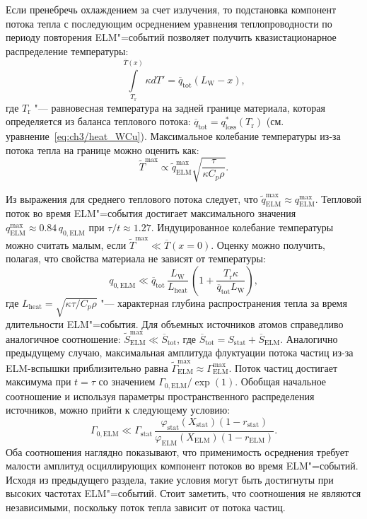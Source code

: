 Если пренебречь охлаждением за счет излучения, то подстановка компонент потока тепла с последующим осреднением уравнения теплопроводности по периоду повторения ELM"=событий позволяет получить квазистационарное распределение температуры:
\begin{equation}
	\label{eq:ch3/temp_av}
	\int \limits_{{T}_\mathrm{r}}^{\overline{T}(x)} \kappa dT' = \overline{q}_{\mathrm{tot}} (L_\mathrm{W}-x),
\end{equation}
где $T_\mathrm{r}$ "--- равновесная температура на задней границе материала, которая определяется из баланса теплового потока: $\overline{q}_{\mathrm{tot}}=q_{\mathrm{loss}}^*(T_\mathrm{r})$ (см. уравнение~\cref{eq:ch3/heat_WCu}). Максимальное колебание температуры из-за потока тепла на границе можно оценить как:
\begin{equation}
	\label{eq:ch3/temp_fluct}
	\widetilde{T}^{\max} \propto \widetilde{q}_{\mathrm{ELM}}^{\max} \sqrt{\frac{\tau}{\kappa C_p \rho}}.
\end{equation}

Из выражения для среднего теплового потока следует, что $\widetilde{q}_{\mathrm{ELM}}^{\max} \approx q_{\mathrm{ELM}}^{\max}$. Тепловой поток во время ELM"=события достигает максимального значения $q_{\mathrm{ELM}}^{\max}\approx 0.84 \, q_{0,\mathrm{ELM}}$ при $\tau/t\approx 1.27$. Индуцированное колебание температуры можно считать малым, если $\widetilde{T}^{\max} \ll \overline{T}(x=0)$. Оценку можно получить, полагая, что свойства материала не зависят от температуры:
\begin{equation}
	\label{eq:heat_condition}
	q_{0,\mathrm{ELM}} \ll \overline{q}_{\mathrm{tot}}\,\frac{ L_\mathrm{W}}{L_{\mathrm{heat}}}\,\left( 1+\frac{T_\mathrm{r}\kappa}{\overline{q}_{\mathrm{tot}}L_\mathrm{W}}\right),
\end{equation}
где $L_{\mathrm{heat}}=\sqrt{\kappa\tau/C_p\rho}$ "--- характерная глубина распространения тепла за время длительности ELM"=события. Для объемных источников атомов справедливо аналогичное соотношение: $\widetilde{S}^{\max}_{\mathrm{ELM}} \ll \overline{S}_{\mathrm{tot}}$, где $\overline{S}_{\mathrm{tot}}=S_{\mathrm{stat}}+\overline{S}_{\mathrm{ELM}}$. Аналогично предыдущему случаю, максимальная амплитуда флуктуации потока частиц из-за ELM-вспышки приблизительно равна $\widetilde{\Gamma}_{\mathrm{ELM}}^{\max} \approx \Gamma_{\mathrm{ELM}}^{\max}$. Поток частиц достигает максимума при $t=\tau$ со значением $\Gamma_{0,\mathrm{ELM}}/\exp(1)$. Обобщая начальное соотношение и используя параметры пространственного распределения источников, можно прийти к следующему условию:
\begin{equation}
	\label{eq:flux_condition}
	\Gamma_{0,\mathrm{ELM}} \ll \Gamma_{\mathrm{stat}}\,\frac{\varphi_{\mathrm{stat}}(X_\mathrm{stat})(1-r_{\mathrm{stat}})}{\varphi_{\mathrm{ELM}}(X_\mathrm{ELM})(1-r_{\mathrm{ELM}})}.
\end{equation}
Оба соотношения наглядно показывают, что применимость осреднения требует малости амплитуд осциллирующих компонент потоков во время ELM"=событий. Исходя из предыдущего раздела, такие условия могут быть достигнуты при высоких частотах ELM"=событий. Стоит заметить, что соотношения не являются независимыми, поскольку поток тепла зависит от потока частиц.

